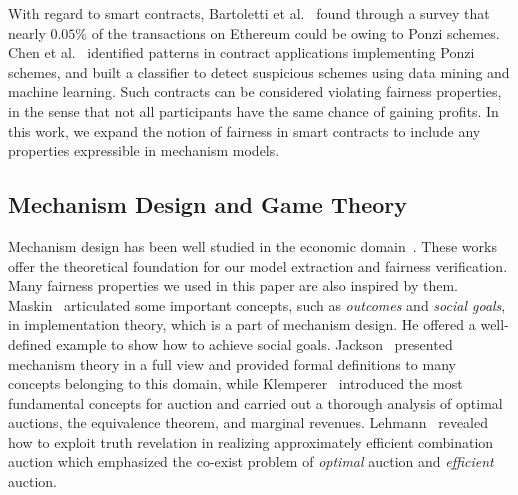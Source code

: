 With regard to smart contracts, Bartoletti et al.~\cite{bartoletti2019dissecting} found through a
survey that nearly $0.05\%$ of the transactions on Ethereum could be owing to Ponzi schemes.
Chen et al.~\cite{chen2018detecting} identified patterns in contract applications implementing
Ponzi schemes, and built a classifier to detect suspicious schemes using data mining and machine
learning.
Such contracts can be considered violating fairness properties, in the sense that not all
participants have the same chance of gaining profits.
In this work, we expand the notion of fairness in smart contracts to include any properties
expressible in mechanism models.

\subsection{Mechanism Design and Game Theory}\label{subsec:MechanismDesign}

Mechanism design has been well studied in the economic
domain~\cite{maskin2008mechanism,jackson2014mechanism,klemperer1999auction,lehmann2002truth}.
These works offer the theoretical foundation for our model extraction and fairness verification.
Many fairness properties we used in this paper are also inspired by them.
Maskin~\cite{maskin2008mechanism} articulated some important concepts, such as \textit{outcomes}
and \textit{social goals}, in implementation theory, which is a part of mechanism design.
He offered a well-defined example to show how to achieve social goals.
Jackson~\cite{jackson2014mechanism} presented mechanism theory in a full view and provided formal
definitions to many concepts belonging to this domain, while Klemperer~\cite{klemperer1999auction}
introduced the most fundamental concepts for auction and carried out a thorough analysis of optimal
auctions, the equivalence theorem, and marginal revenues.
Lehmann~\cite{lehmann2002truth} revealed how to exploit truth revelation in realizing approximately
efficient combination auction which emphasized the co-exist problem of \textit{optimal} auction and
\textit{efficient} auction.

